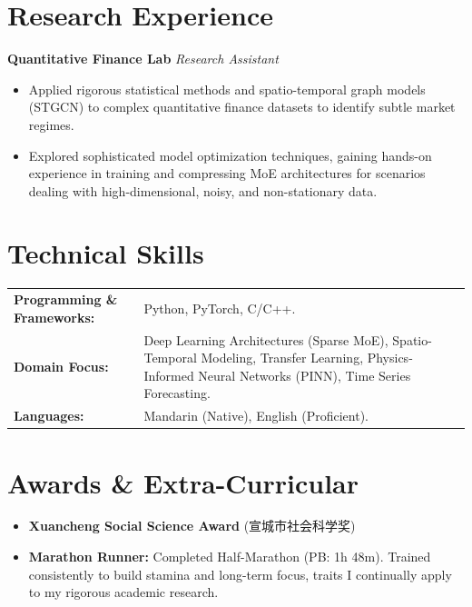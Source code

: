 \documentclass[10pt,a4paper]{article}
\begin{document}
\section{Research Experience}
\vspace{-2pt}
{\small
\textbf{Quantitative Finance Lab} \hfill \textit{Research Assistant}
\begin{itemize}
    \item Applied rigorous statistical methods and spatio-temporal graph models (STGCN) to complex quantitative finance datasets to identify subtle market regimes.
    \item Explored sophisticated model optimization techniques, gaining hands-on experience in training and compressing MoE architectures for scenarios dealing with high-dimensional, noisy, and non-stationary data.
\end{itemize}
}

\section{Technical Skills}
\vspace{-2pt}
{\small
\begin{tabularx}{\textwidth}{@{}l X@{}}
\textbf{Programming \& Frameworks:} & Python, PyTorch, C/C++. \\[3pt]
\textbf{Domain Focus:} & Deep Learning Architectures (Sparse MoE), Spatio-Temporal Modeling, Transfer Learning, Physics-Informed Neural Networks (PINN), Time Series Forecasting. \\[3pt]
\textbf{Languages:} & Mandarin (Native), English (Proficient).
\end{tabularx}
}

\section{Awards \& Extra-Curricular}
\vspace{-2pt}
{\small
\begin{itemize}
    \item \textbf{Xuancheng Social Science Award} (宣城市社会科学奖)
    \item \textbf{Marathon Runner:} Completed Half-Marathon (PB: 1h 48m). Trained consistently to build stamina and long-term focus, traits I continually apply to my rigorous academic research.
\end{itemize}
}
\end{document}
